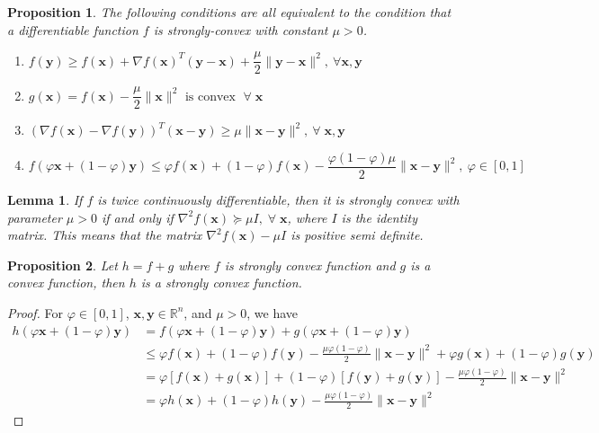 \documentclass[12pt]{report}
\newtheorem{pro}{Proposition}[section]
\newtheorem{lemma}{Lemma}[section]
\numberwithin{equation}{section}
\begin{document}
\begin{pro}
\normalfont
The following conditions are all equivalent to the condition that a differentiable function $f$ is strongly-convex with constant $\mu > 0$.
\begin{enumerate}[label=(\alph*)]
\item $f(\bm{y})\ge f(\bm{x})+\nabla f(\bm{x})^T(\bm{y}-\bm{x})+\dfrac{\mu}{2}\lVert \bm{y}-\bm{x} \rVert^2,~\forall \bm{x}, \bm{y}$
\item $g(\bm{x}) = f(\bm{x})-\dfrac{\mu}{2} \| \bm{x} \|^2 \text{ is convex }\;\forall \;\bm{x}$
\item $(\nabla f(\bm{x}) - \nabla f(\bm{y}))^T(\bm{x}-\bm{y}) \ge \mu \lVert \bm{x}-\bm{y}\rVert^2,~\forall \; \bm{x}, \bm{y}$
\item $f(\varphi \bm{x}+ (1-\varphi) \bm{y}) \le \varphi f(\bm{x}) + (1-\varphi) f(\bm{x}) - \dfrac{\varphi (1-\varphi)\mu}{2} \| \bm{x}-\bm{y} \|^2,~\varphi \in [0,1]$
\end{enumerate}
\end{pro}

\begin{lemma}
\normalfont
If $f$ is twice continuously differentiable, then it is strongly convex with parameter $\mu > 0$ if and only if $\nabla^2 f(\bm{x}) \succeq \mu I,\;\forall\;\bm{x}$, where $I$ is the identity matrix. This means that the matrix $\nabla^2 f(\bm{x}) - \mu I$ is positive semi definite.
\end{lemma}
\begin{pro}\label{pro:sum}
\normalfont
Let $h=f+g$ where $f$ is strongly convex function and $g$ is a convex function, then $h$ is a strongly convex function.
\end{pro}
\begin{proof}
For $\varphi \in [0,1]$, $\bm{x},\bm{y} \in \mathbb{R}^n$, and $\mu > 0$, we have
\begin{align*}
h(\varphi \bm{x} + (1-\varphi)\bm{y}) &= f(\varphi \bm{x} + (1-\varphi)\bm{y}) + g(\varphi \bm{x} + (1-\varphi)\bm{y})\\
	& \le \varphi f(\bm{x}) + (1-\varphi)f(\bm{y}) - \frac{\mu \varphi (1-\varphi)}{2}\|\bm{x}-\bm{y}\|^2 + \varphi g(\bm{x}) + (1-\varphi)g(\bm{y})\\
	& = \varphi [f(\bm{x})+g(\bm{x})] + (1-\varphi) [f(\bm{y})+g(\bm{y})] - \frac{\mu \varphi (1-\varphi)}{2}\|\bm{x}-\bm{y}\|^2 \\
	& = \varphi h(\bm{x}) + (1-\varphi) h(\bm{y}) - \frac{\mu \varphi (1-\varphi)}{2}\|\bm{x}-\bm{y}\|^2 
\end{align*} 
\end{proof}
\end{document}

